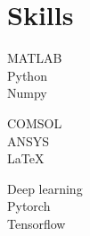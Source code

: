 \documentclass{my_cv}%
\begin{document}

\section{Skills}
\vspace{1em}
\begin{minipage}{0.35\textwidth}
    MATLAB \\           
  Python \\
  Numpy \\ 
      
\end{minipage}
\begin{minipage}{0.35\textwidth}
   COMSOL \\
   ANSYS \\
   \LaTeX \\
\end{minipage}
\begin{minipage}{0.35\textwidth}
   Deep learning \\
   Pytorch \\
   Tensorflow  \\
\end{minipage}
\end{document}
